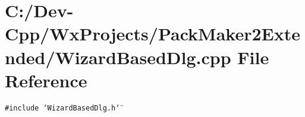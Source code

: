 \section{C:/Dev-Cpp/Wx\-Projects/Pack\-Maker2Extended/Wizard\-Based\-Dlg.cpp File Reference}
\label{_wizard_based_dlg_8cpp}
{\tt \#include \char`\"{}Wizard\-Based\-Dlg.h\char`\"{}}\par
